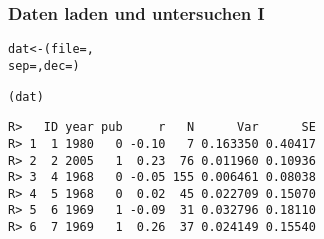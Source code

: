 \begin{frame}[fragile]\frametitle{Daten laden und untersuchen I}
\begin{footnotesize}



\begin{knitrout}
\color{fgcolor}\begin{kframe}
\begin{alltt}
dat <- (file = ,
                sep = , dec = )

(dat)
\end{alltt}
\begin{verbatim}
R>   ID year pub     r   N      Var      SE
R> 1  1 1980   0 -0.10   7 0.163350 0.40417
R> 2  2 2005   1  0.23  76 0.011960 0.10936
R> 3  4 1968   0 -0.05 155 0.006461 0.08038
R> 4  5 1968   0  0.02  45 0.022709 0.15070
R> 5  6 1969   1 -0.09  31 0.032796 0.18110
R> 6  7 1969   1  0.26  37 0.024149 0.15540
\end{verbatim}
\end{kframe}
\end{knitrout}

\end{footnotesize}
\end{frame}


